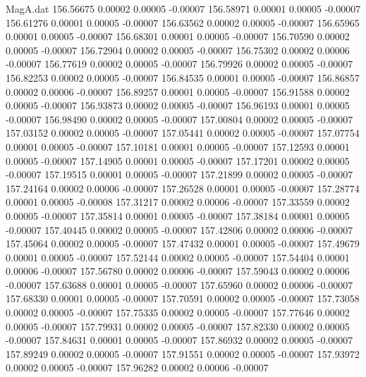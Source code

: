 \begin{filecontents}{MagA.dat}
 156.56675    0.00002    0.00005   -0.00007
 156.58971    0.00001    0.00005   -0.00007
 156.61276    0.00001    0.00005   -0.00007
 156.63562    0.00002    0.00005   -0.00007
 156.65965    0.00001    0.00005   -0.00007
 156.68301    0.00001    0.00005   -0.00007
 156.70590    0.00002    0.00005   -0.00007
 156.72904    0.00002    0.00005   -0.00007
 156.75302    0.00002    0.00006   -0.00007
 156.77619    0.00002    0.00005   -0.00007
 156.79926    0.00002    0.00005   -0.00007
 156.82253    0.00002    0.00005   -0.00007
 156.84535    0.00001    0.00005   -0.00007
 156.86857    0.00002    0.00006   -0.00007
 156.89257    0.00001    0.00005   -0.00007
 156.91588    0.00002    0.00005   -0.00007
 156.93873    0.00002    0.00005   -0.00007
 156.96193    0.00001    0.00005   -0.00007
 156.98490    0.00002    0.00005   -0.00007
 157.00804    0.00002    0.00005   -0.00007
 157.03152    0.00002    0.00005   -0.00007
 157.05441    0.00002    0.00005   -0.00007
 157.07754    0.00001    0.00005   -0.00007
 157.10181    0.00001    0.00005   -0.00007
 157.12593    0.00001    0.00005   -0.00007
 157.14905    0.00001    0.00005   -0.00007
 157.17201    0.00002    0.00005   -0.00007
 157.19515    0.00001    0.00005   -0.00007
 157.21899    0.00002    0.00005   -0.00007
 157.24164    0.00002    0.00006   -0.00007
 157.26528    0.00001    0.00005   -0.00007
 157.28774    0.00001    0.00005   -0.00008
 157.31217    0.00002    0.00006   -0.00007
 157.33559    0.00002    0.00005   -0.00007
 157.35814    0.00001    0.00005   -0.00007
 157.38184    0.00001    0.00005   -0.00007
 157.40445    0.00002    0.00005   -0.00007
 157.42806    0.00002    0.00006   -0.00007
 157.45064    0.00002    0.00005   -0.00007
 157.47432    0.00001    0.00005   -0.00007
 157.49679    0.00001    0.00005   -0.00007
 157.52144    0.00002    0.00005   -0.00007
 157.54404    0.00001    0.00006   -0.00007
 157.56780    0.00002    0.00006   -0.00007
 157.59043    0.00002    0.00006   -0.00007
 157.63688    0.00001    0.00005   -0.00007
 157.65960    0.00002    0.00006   -0.00007
 157.68330    0.00001    0.00005   -0.00007
 157.70591    0.00002    0.00005   -0.00007
 157.73058    0.00002    0.00005   -0.00007
 157.75335    0.00002    0.00005   -0.00007
 157.77646    0.00002    0.00005   -0.00007
 157.79931    0.00002    0.00005   -0.00007
 157.82330    0.00002    0.00005   -0.00007
 157.84631    0.00001    0.00005   -0.00007
 157.86932    0.00002    0.00005   -0.00007
 157.89249    0.00002    0.00005   -0.00007
 157.91551    0.00002    0.00005   -0.00007
 157.93972    0.00002    0.00005   -0.00007
 157.96282    0.00002    0.00006   -0.00007

\end{filecontents}
